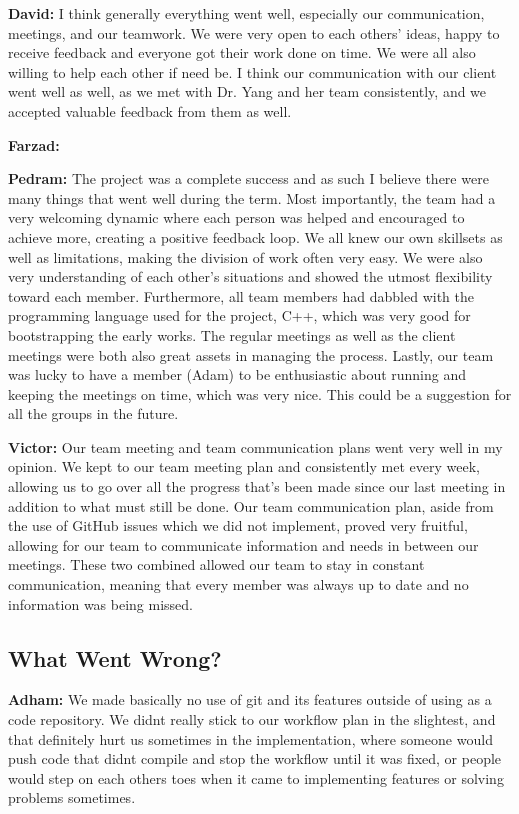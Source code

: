 \documentclass{article}
\begin{document}
\textbf{David:} I think generally everything went well, especially our communication, meetings, and our teamwork. We 
were very open to each others' ideas, happy to receive feedback and everyone got their work done on time. We were all 
also willing to help each other if need be. I think our communication with our client went well as well, as we met with 
Dr. Yang and her team consistently, and we accepted valuable feedback from them as well. 

\textbf{Farzad:}

\textbf{Pedram:} The project was a complete success and as such I believe there were many things that went well during the term. Most importantly, the team had a very welcoming dynamic where each person was helped and encouraged to achieve more, creating a positive feedback loop. We all knew our own skillsets as well as limitations, making the division of work often very easy. We were also very understanding of each other’s situations and showed the utmost flexibility toward each member. Furthermore, all team members had dabbled with the programming language used for the project, C++, which was very good for bootstrapping the early works. The regular meetings as well as the client meetings were both also great assets in managing the process. Lastly, our team was lucky to have a member (Adam) to be enthusiastic about running and keeping the meetings on time, which was very nice. This could be a suggestion for all the groups in the future. 

\textbf{Victor:} Our team meeting and team communication plans went very well in my opinion. We kept to our team meeting plan and consistently met every week, 
allowing us to go over all the progress that's been made since our last meeting in addition to what must still be done. Our team communication plan, aside from the use of 
GitHub issues which we did not implement, proved very fruitful, allowing for our team to communicate information and needs in between our meetings. These two combined allowed 
our team to stay in constant communication, meaning that every member was always up to date and no information was being missed.

\subsection{What Went Wrong?}

\textbf{Adham:} We made basically no use of git and its features outside of using as a code repository. We didnt really stick to our workflow plan in the slightest, and that
definitely hurt us sometimes in the implementation, where someone would push code that didnt compile and stop the workflow until it was fixed, or people would step on each others
toes when it came to implementing features or solving problems sometimes.
\end{document}
